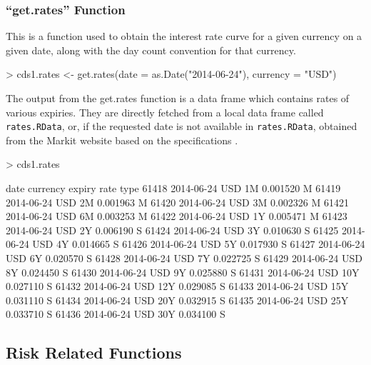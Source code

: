\documentclass{jss}
\begin{document}
\subsubsection{``get.rates'' Function}
\label{sec:get.ratesFunction}

This is a function used to obtain the interest rate curve for a given currency on a given date, along with the day count convention for that currency.

\begin{Schunk}
\begin{Sinput}
> cds1.rates <- get.rates(date = as.Date("2014-06-24"), currency = "USD")
\end{Sinput}
\end{Schunk}

The output from the get.rates function is a data frame which contains rates of various expiries. They are directly fetched from a local data frame called \texttt{rates.RData}, or, if the requested date is not available in \texttt{rates.RData}, obtained from the Markit website based on the specifications \citep{rates}.

\begin{Schunk}
\begin{Sinput}
> cds1.rates
\end{Sinput}
\begin{Soutput}
            date currency expiry     rate type
61418 2014-06-24      USD     1M 0.001520    M
61419 2014-06-24      USD     2M 0.001963    M
61420 2014-06-24      USD     3M 0.002326    M
61421 2014-06-24      USD     6M 0.003253    M
61422 2014-06-24      USD     1Y 0.005471    M
61423 2014-06-24      USD     2Y 0.006190    S
61424 2014-06-24      USD     3Y 0.010630    S
61425 2014-06-24      USD     4Y 0.014665    S
61426 2014-06-24      USD     5Y 0.017930    S
61427 2014-06-24      USD     6Y 0.020570    S
61428 2014-06-24      USD     7Y 0.022725    S
61429 2014-06-24      USD     8Y 0.024450    S
61430 2014-06-24      USD     9Y 0.025880    S
61431 2014-06-24      USD    10Y 0.027110    S
61432 2014-06-24      USD    12Y 0.029085    S
61433 2014-06-24      USD    15Y 0.031110    S
61434 2014-06-24      USD    20Y 0.032915    S
61435 2014-06-24      USD    25Y 0.033710    S
61436 2014-06-24      USD    30Y 0.034100    S
\end{Soutput}
\end{Schunk}

\subsection{Risk Related Functions}
\label{sec:riskFunctions}
\end{document}
